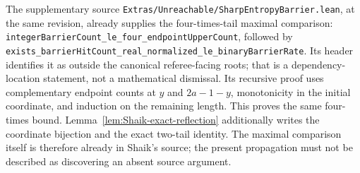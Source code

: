 The supplementary source
\texttt{Extras/Unreachable/SharpEntropyBarrier.lean}, at the same
revision, already supplies the four-times-tail maximal comparison:
\texttt{integerBarrierCount\_le\_four\_endpointUpperCount}, followed by
\texttt{exists\_barrierHitCount\_real\_normalized\_le\_binaryBarrierRate}.
Its header identifies it as outside the canonical referee-facing roots;
that is a dependency-location statement, not a mathematical dismissal.
Its recursive proof uses complementary endpoint counts at \(y\) and
\(2a-1-y\), monotonicity in the initial coordinate, and induction on
the remaining length. This proves the same four-times bound.
Lemma~\ref{lem:Shaik-exact-reflection} additionally writes the
coordinate bijection and the exact two-tail identity. The maximal
comparison itself is therefore already in Shaik's source;
the present propagation must not be described as discovering an
absent source argument.

